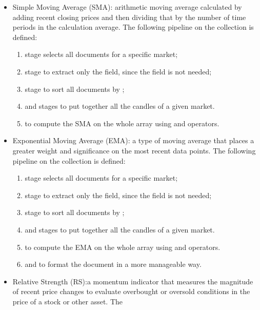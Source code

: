 \begin{itemize}
	\item Simple Moving Average (SMA): arithmetic moving average calculated
		by adding recent closing prices and then dividing that by the
		number of time periods in the calculation average. The following
		pipeline on the  collection is defined:
		\begin{enumerate}
			\item {} stage selects all documents for a
				specific market;
			\item {} stage to extract only the
				 field, since the  field
				is not needed;
			\item {} stage to sort all documents by
				;
			\item {} and  stages to
				put together all the candles of a given market.
			\item {} to compute the SMA on the whole
				array using  and 
				operators.
		\end{enumerate}
	\item Exponential Moving Average (EMA): a type of moving average that
		places a greater weight and significance on the most recent data
		points. The following pipeline on the 
		collection is defined:
		\begin{enumerate}
			\item {} stage selects all documents for a
				specific market;
			\item {} stage to extract only the
				 field, since the  field
				is not needed;
			\item {} stage to sort all documents by
				;
			\item {} and  stages to
				put together all the candles of a given market.
			\item {} to compute the EMA on the whole
				array using  and 
				operators.
			\item {} and  to format
				the document in a more manageable way.
		\end{enumerate}
	\item Relative Strength (RS):a momentum indicator that measures the
		magnitude of recent price changes to evaluate overbought or
		oversold conditions in the price of a stock or other asset. The

\end{itemize}
